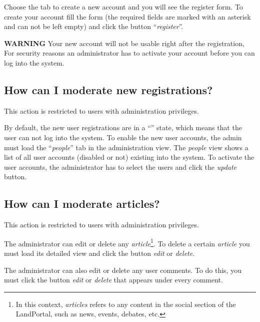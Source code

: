 Choose the tab to create a new account and you will see the register form.  To create your account fill the form (the required fields are marked with an asterisk and can not be left empty) and click the button ``\textit{register}''.

\textbf{WARNING}  Your new account will not be usable right after the registration, For security reasons an administrator has to activate your account before you can log into the system.

\subsection{How can I moderate new registrations?}
This action is restricted to users with administration privileges.

By default, the new user registrations are in a ``'' state, which means that the user can not log into the system.  To enable the new user accounts, the admin must load the ``\textit{people}'' tab in the administration view.  The \textit{people} view shows a list of all user accounts (disabled or not) existing into the system.  To activate the user accounts, the administrator has to select the users and click the \textit{update} button.

\subsection{How can I moderate articles?}
This action is restricted to users with administration privileges.

The administrator can edit or delete any \textit{article}\footnote{In this context, \textit{articles} refers to any content in the social section of the LandPortal, such as news, events, debates, etc.}.  To delete a certain \textit{article} you must load its detailed view and click the button \textit{edit} or \textit{delete}.

The administrator can also edit or delete any user comments.  To do this, you must click the button \textit{edit} or \textit{delete} that appears under every comment.